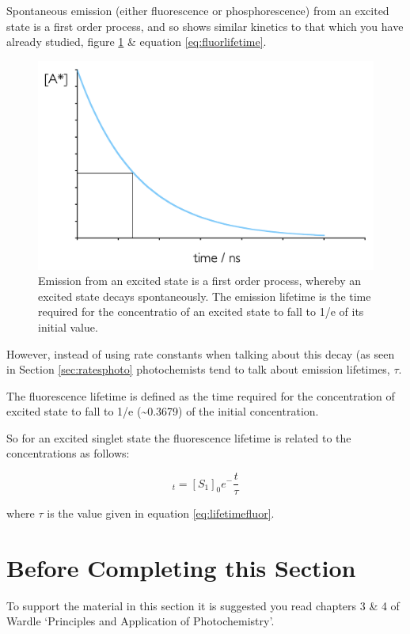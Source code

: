\documentclass[
]{book}
\begin{document}
Spontaneous emission (either fluorescence or phosphorescence) from an excited state is a first order process, and so shows similar kinetics to that which you have already studied, figure \ref{fig:fluorlifetime} \& equation \eqref{eq:fluorlifetime}.

\begin{figure}

{\centering \includegraphics[width=0.5\linewidth]{images/fluorlifetime} 

}

\caption{Emission from an excited state is a first order process, whereby an excited state decays spontaneously. The emission lifetime is the time required for the concentratio of an excited state to fall to 1/e of its initial value.}\label{fig:fluorlifetime}
\end{figure}

However, instead of using rate constants when talking about this decay (as seen in Section \ref{sec:ratesphoto} photochemists tend to talk about emission lifetimes, \(\tau\).

The fluorescence lifetime is defined as the time required for the concentration of excited state to fall to 1/e (\textasciitilde0.3679) of the initial concentration.

So for an excited singlet state the fluorescence lifetime is related to the concentrations as follows:

\begin{equation}
[S_1]_t=[S_1]_0e^-{\frac{t}{\tau}}
\label{eq:fluorlifetime}
\end{equation}

where \(\tau\) is the value given in equation \eqref{eq:lifetimefluor}.

\hypertarget{before-completing-this-section}{%
\section{Before Completing this Section}\label{before-completing-this-section}}

To support the material in this section it is suggested you read chapters 3 \& 4 of Wardle `Principles and Application of Photochemistry'.
\end{document}
